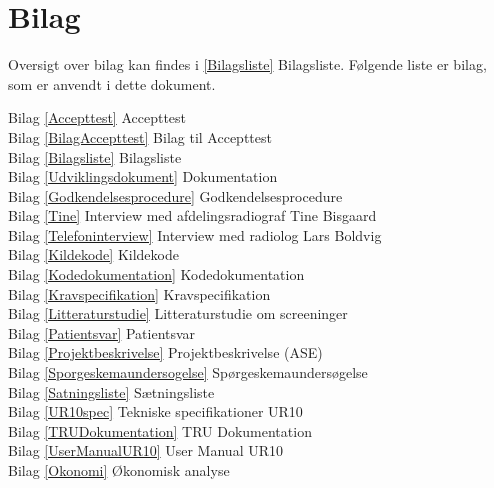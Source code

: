 \chapter{Bilag}\label{kapitel_Bilag}
Oversigt over bilag kan findes i \ref{Bilagsliste} Bilagsliste. Følgende liste er bilag, som er anvendt i dette dokument. 

Bilag \ref{Accepttest} Accepttest \\
Bilag \ref{BilagAccepttest} Bilag til Accepttest \\
Bilag \ref{Bilagsliste} Bilagsliste \\ 
Bilag \ref{Udviklingsdokument} Dokumentation\\
Bilag \ref{Godkendelsesprocedure} Godkendelsesprocedure \\
Bilag \ref{Tine} Interview med afdelingsradiograf Tine Bisgaard \\
Bilag \ref{Telefoninterview} Interview med radiolog Lars Boldvig \\
Bilag \ref{Kildekode} Kildekode \\
Bilag \ref{Kodedokumentation} Kodedokumentation \\
Bilag \ref{Kravspecifikation} Kravspecifikation \\
Bilag \ref{Litteraturstudie} Litteraturstudie om screeninger \\
Bilag \ref{Patientsvar} Patientsvar \\
Bilag \ref{Projektbeskrivelse} Projektbeskrivelse (ASE) \\
Bilag \ref{Sporgeskemaundersogelse} Spørgeskemaundersøgelse\\
Bilag \ref{Satningsliste} Sætningsliste \\
Bilag \ref{UR10spec} Tekniske specifikationer UR10 \\
Bilag \ref{TRUDokumentation} TRU Dokumentation \\
Bilag \ref{UserManualUR10} User Manual UR10 \\
Bilag \ref{Okonomi} Økonomisk analyse \\


